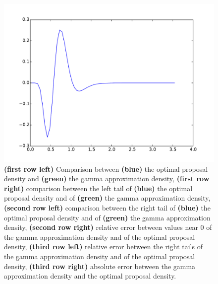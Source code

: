 \documentclass{article}
\begin{document}
\begin{figure}[htb]
\begin{minipage}{.45\textwidth}
	\end{minipage}
	\begin{minipage}{.45\textwidth}
		\centering
		\includegraphics[width=0.97\linewidth]{bootstrap-filter/absolute_complex_3_3.pdf}
	\end{minipage}
	\caption{\textbf{(first row left)} Comparison between \textbf{(blue)} the optimal proposal density and \textbf{(green)} the gamma approximation density, \textbf{(first row right)} comparison between  the left tail of \textbf{(blue)} the optimal proposal density and of \textbf{(green)} the gamma approximation density, \textbf{(second row left)} comparison between the right tail of \textbf{(blue)} the optimal proposal density and of \textbf{(green)} the gamma approximation density, \textbf{(second row right)} relative error between values near 0 of the gamma approximation density and of the optimal proposal density, \textbf{(third row left)} relative error between the right tails of the gamma approximation density and of the optimal proposal density, \textbf{(third row right)} absolute error between the gamma approximation density and the optimal proposal density.}
	\label{fig:complex}
\end{figure}
\end{document}

